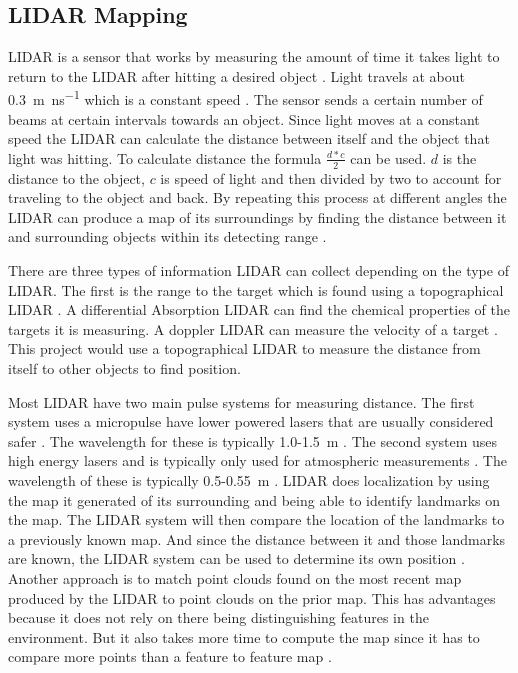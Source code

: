 \documentclass{article}
\begin{document}
  \subsection{LIDAR Mapping}
    LIDAR is a sensor that works by measuring the amount of time it takes light to return to the LIDAR after hitting a desired object \cite{keith_lidar_2007}. Light travels at about \SI{0.3}{\meter\per\nano\second} which is a constant speed \cite{keith_lidar_2007}. The sensor sends a certain number of beams at certain intervals towards an object. Since light moves at a constant speed the LIDAR can calculate the distance between itself and the object that light was hitting. To calculate distance the formula $\frac{d*c}{2}$ can be used. $d$ is the distance to the object, $c$ is speed of light and then divided by two to account for traveling to the object and back. By repeating this process at different angles the LIDAR can produce a map of its surroundings by finding the distance between it and surrounding objects within its detecting range \cite{keith_lidar_2007}.

    There are three types of information LIDAR can collect depending on the type of LIDAR. The first is the range to the target which is found using a topographical LIDAR \cite{keith_lidar_2007}. A differential Absorption LIDAR can find the chemical properties of the targets it is measuring. A doppler LIDAR can measure the velocity of a target \cite{keith_lidar_2007}. This project would use a topographical LIDAR to measure the distance from itself to other objects to find position.

    Most LIDAR have two main pulse systems for measuring distance. The first system uses a micropulse have lower powered lasers that are usually considered safer \cite{keith_lidar_2007}. The wavelength for these is typically 1.0-\SI{1.5}{\meter} \cite{lidar_uk_how_2017}. The second system uses high energy lasers and is typically only used for atmospheric measurements \cite{keith_lidar_2007}. The wavelength of these is typically 0.5-\SI{0.55}{\meter} \cite{lidar_uk_how_2017}.
    LIDAR does localization by using the map it generated of its surrounding and being able to identify landmarks on the map. The LIDAR system will then compare the location of the landmarks to a previously known map. And since the distance between it and those landmarks are known, the LIDAR system can be used to determine its own position \cite{schlichting_vehicle_2016}. Another approach is to match point clouds found on the most recent map produced by the LIDAR to point clouds on the prior map. This has advantages because it does not rely on there being distinguishing features in the environment. But it also takes more time to compute the map since it has to compare more points than a feature to feature map \cite{li_extracting_2010}.
\end{document}
